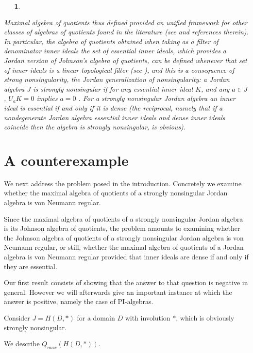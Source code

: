 \documentclass[a4paper,twoside,11pt]{article}
\theoremstyle{plain}
\theoremstyle{miestilo}
\theoremstyle{misnotas}
\newtheorem{apartado}[subsection]{\ {\ }}
\begin{document}
\begin{apartado}
\begin{enumerate}
\end{enumerate}

Maximal algebra of quotients thus defined provided an unified framework for other classes of algebras of quotients found in the literature (see \cite{densos} and references therein). In particular, the algebra of quotients obtained when taking as a filter of denominator inner ideals the set of essential inner ideals, which provides a Jordan version of Johnson's algebra of quotients, can be defined whenever that set of inner ideals is a linear topological filter (see \cite[12]{esenciales}), and this is a consequence of strong nonsingularity, the Jordan generalization of nonsingularity: a Jordan algebra $J$ is strongly nonsingular if for any essential inner ideal $K$, and any $a\in J$, $U_{a}K=0$ implies $a=0$ \cite[1.3]{esenciales}. For a strongly nonsingular Jordan algebra an inner ideal is essential if and only if it is dense \cite[1.10]{densos} (the reciprocal, namely that if a nondegenerate Jordan algebra essential inner ideals and dense inner ideals coincide then the algebra is strongly nonsingular, is obvious).

\end{apartado}

\section{A counterexample}

We next address the problem posed in the introduction. Concretely we examine whether the maximal algebra of quotients of a strongly nonsingular Jordan algebra is von Neumann regular.

Since the maximal algebra of quotients of a strongly nonsingular Jordan algebra is its Johnson algebra of quotients, the problem amounts to examining whether the Johnson algebra of quotients of a strongly nonsingular Jordan algebra is von Neumann regular, or still, whether the maximal algebra of quotients of a Jordan algebra is von Neumann regular provided that inner ideals are dense if and only if they are essential.

Our first result consists of showing that the answer to that question is negative in general. However we will afterwards give an important instance at which the answer is positive, namely the case of PI-algebras.

Consider $J=H(D,\ast)$ for a domain $D$ with involution $\ast$, which is obviously strongly nonsingular.

We describe $Q_{max}(H(D,\ast))$.
\end{document}
